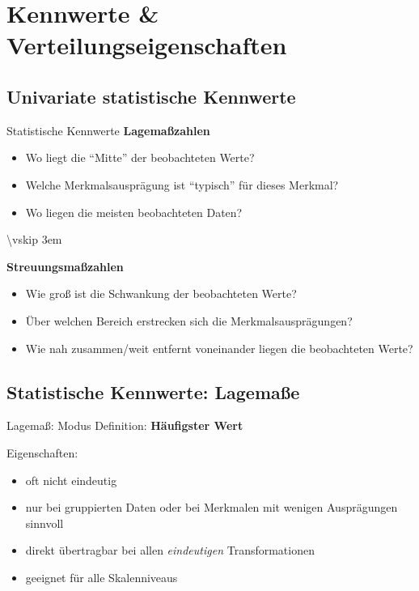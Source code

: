 \documentclass[
  10pt,
  ignorenonframetext,
]{beamer}
\providecommand{\tightlist}{%
  \setlength{\itemsep}{0pt}\setlength{\parskip}{0pt}}
\begin{document}
\section{Kennwerte \&
Verteilungseigenschaften}\label{kennwerte-verteilungseigenschaften}

\subsection{Univariate statistische
Kennwerte}\label{univariate-statistische-kennwerte}

\begin{frame}{Statistische Kennwerte}
\label{statistische-kennwerte}
\textbf{Lagemaßzahlen}

\begin{itemize}
\tightlist
\item
  Wo liegt die ``Mitte'' der beobachteten Werte?
\item
  Welche Merkmalsausprägung ist ``typisch'' für dieses Merkmal?
\item
  Wo liegen die meisten beobachteten Daten?
\end{itemize}

\textbackslash vskip 3em

\textbf{Streuungsmaßzahlen}

\begin{itemize}
\tightlist
\item
  Wie groß ist die Schwankung der beobachteten Werte?
\item
  Über welchen Bereich erstrecken sich die Merkmalsausprägungen?
\item
  Wie nah zusammen/weit entfernt voneinander liegen die beobachteten
  Werte?
\end{itemize}
\end{frame}

\subsection{Statistische Kennwerte:
Lagemaße}\label{statistische-kennwerte-lagemauxdfe}

\begin{frame}{Lagemaß: Modus}
\label{lagemauxdf-modus}
Definition: \textbf{Häufigster Wert}

Eigenschaften:

\begin{itemize}
\tightlist
\item
  oft nicht eindeutig
\item
  nur bei gruppierten Daten oder bei Merkmalen mit wenigen Ausprägungen
  sinnvoll
\item
  direkt übertragbar bei allen \emph{eindeutigen} Transformationen
\item
  geeignet für alle Skalenniveaus
\end{itemize}
\end{frame}
\end{document}
